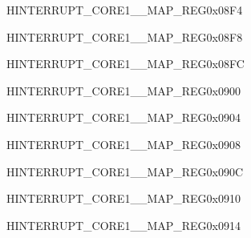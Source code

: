 \begin{register}{H}{INTERRUPT\_CORE1\_\_MAP\_REG}{0x08F4}\label{regdesc:INTERRUPTCORE1DCACHEPRELOADINTMAPREG}
\end{register}
\vspace{-3em}

\begin{register}{H}{INTERRUPT\_CORE1\_\_MAP\_REG}{0x08F8}\label{regdesc:INTERRUPTCORE1ICACHEPRELOADINTMAPREG}
\end{register}
\vspace{-3em}

\begin{register}{H}{INTERRUPT\_CORE1\_\_MAP\_REG}{0x08FC}\label{regdesc:INTERRUPTCORE1DCACHESYNCINTMAPREG}
\end{register}
\vspace{-3em}

\begin{register}{H}{INTERRUPT\_CORE1\_\_MAP\_REG}{0x0900}\label{regdesc:INTERRUPTCORE1ICACHESYNCINTMAPREG}
\end{register}
\vspace{-3em}

\begin{register}{H}{INTERRUPT\_CORE1\_\_MAP\_REG}{0x0904}\label{regdesc:INTERRUPTCORE1APBADCINTMAPREG}
\end{register}
\vspace{-3em}

\begin{register}{H}{INTERRUPT\_CORE1\_\_MAP\_REG}{0x0908}\label{regdesc:INTERRUPTCORE1DMACH0INTMAPREG}
\end{register}
\vspace{-3em}

\begin{register}{H}{INTERRUPT\_CORE1\_\_MAP\_REG}{0x090C}\label{regdesc:INTERRUPTCORE1DMACH1INTMAPREG}
\end{register}
\vspace{-3em}

\begin{register}{H}{INTERRUPT\_CORE1\_\_MAP\_REG}{0x0910}\label{regdesc:INTERRUPTCORE1DMACH2INTMAPREG}
\end{register}
\vspace{-3em}

\begin{register}{H}{INTERRUPT\_CORE1\_\_MAP\_REG}{0x0914}\label{regdesc:INTERRUPTCORE1DMACH3INTMAPREG}
\end{register}
\vspace{-3em}

